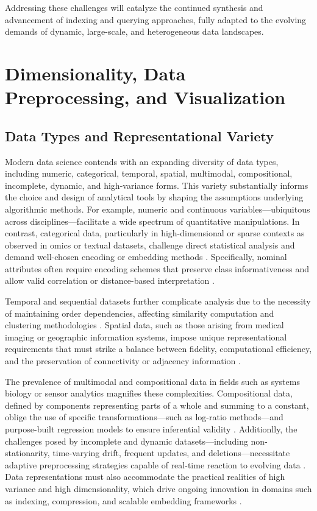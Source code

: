 \documentclass[sigconf]{acmart}
\begin{document}
Addressing these challenges will catalyze the continued synthesis and advancement of indexing and querying approaches, fully adapted to the evolving demands of dynamic, large-scale, and heterogeneous data landscapes.

\section{Dimensionality, Data Preprocessing, and Visualization}

\subsection{Data Types and Representational Variety}

Modern data science contends with an expanding diversity of data types, including numeric, categorical, temporal, spatial, multimodal, compositional, incomplete, dynamic, and high-variance forms. This variety substantially informs the choice and design of analytical tools by shaping the assumptions underlying algorithmic methods. For example, numeric and continuous variables—ubiquitous across disciplines—facilitate a wide spectrum of quantitative manipulations. In contrast, categorical data, particularly in high-dimensional or sparse contexts as observed in omics or textual datasets, challenge direct statistical analysis and demand well-chosen encoding or embedding methods \cite{ref61,ref62,ref63}. Specifically, nominal attributes often require encoding schemes that preserve class informativeness and allow valid correlation or distance-based interpretation \cite{ref61}.

Temporal and sequential datasets further complicate analysis due to the necessity of maintaining order dependencies, affecting similarity computation and clustering methodologies \cite{ref64,ref65}. Spatial data, such as those arising from medical imaging or geographic information systems, impose unique representational requirements that must strike a balance between fidelity, computational efficiency, and the preservation of connectivity or adjacency information \cite{ref67,ref68,ref69,ref70}.

The prevalence of multimodal and compositional data in fields such as systems biology or sensor analytics magnifies these complexities. Compositional data, defined by components representing parts of a whole and summing to a constant, oblige the use of specific transformations—such as log-ratio methods—and purpose-built regression models to ensure inferential validity \cite{ref90,ref92,ref94}. Additionlly, the challenges posed by incomplete and dynamic datasets—including non-stationarity, time-varying drift, frequent updates, and deletions—necessitate adaptive preprocessing strategies capable of real-time reaction to evolving data \cite{ref66,ref70,ref76,ref77,ref78,ref86}. Data representations must also accommodate the practical realities of high variance and high dimensionality, which drive ongoing innovation in domains such as indexing, compression, and scalable embedding frameworks \cite{ref69,ref70,ref78,ref86,ref90}.
\end{document}
